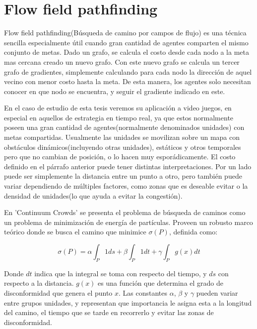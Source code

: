 
\chapter{Flow field pathfinding}

Flow field pathfinding(Búsqueda de camino por campos de flujo) es una técnica
sencilla especialmente útil cuando gran cantidad de agentes comparten el mismo
conjunto de metas. Dado un grafo, se calcula el costo desde cada nodo a la meta
mas cercana creado un nuevo grafo. Con este nuevo grafo se calcula un tercer
grafo de gradientes, simplemente calculando para cada nodo la dirección de aquel
vecino con menor costo hasta la meta. De esta manera, los agentes solo necesitan
conocer en que nodo se encuentra, y seguir el gradiente indicado en este.

En el caso de estudio de esta tesis veremos su aplicación a video juegos, en
especial en aquellos de estrategia en tiempo real, ya que estos normalmente
poseen una gran cantidad de agentes(normalmente denominados unidades) con metas
compartidas. Usualmente las unidades se movilizan sobre un mapa con obstáculos
dinámicos(incluyendo otras unidades), estáticos y otros temporales pero que no
cambian de posición, o lo hacen muy esporádicamente. El costo definido en el
párrafo anterior puede tener distintas interpretaciones. Por un lado puede ser
simplemente la distancia entre un punto a otro, pero también puede variar
dependiendo de múltiples factores, como zonas que es deseable evitar o la
densidad de unidades(lo que ayuda a evitar la congestión).

En 'Continuum Crowds'\cite{CC06} se presenta el problema de búsqueda de caminos
como un problema de minimización de energía de partículas. Proveen un robusto
marco teórico donde se busca el camino que minimice $ \sigma(P) $, definida
como:

\begin{equation} \sigma(P) = \alpha \int_P 1 ds + \beta \int_P 1 dt + \gamma
\int_P g(x) dt \label{eqCost} \end{equation}

Donde $dt$ indica que la integral se toma con respecto del tiempo, y $ds$ con
respecto a la distancia. $ g(x) $ es una función que determina el grado de
disconformidad que genera el punto $ x $. Las constantes $\alpha$, $\beta$ y
$\gamma$ pueden variar entre grupos unidades, y representan que importancia le
asigna esta a la longitud del camino, el tiempo que se tarde en recorrerlo y
evitar las zonas de disconformidad.

